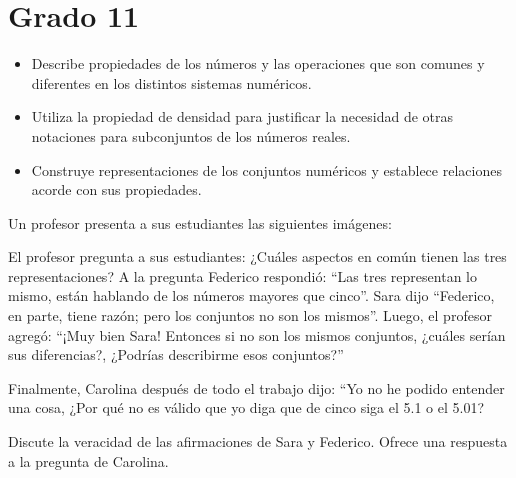\section{Grado 11}\label{grado:11}


\evidencias

\begin{itemize}
  \item Describe propiedades de los números y las operaciones que son comunes y diferentes en los distintos sistemas numéricos.
  \item Utiliza la propiedad de densidad para justificar la necesidad de otras notaciones para subconjuntos de los números reales.
  \item Construye representaciones de los conjuntos numéricos y establece relaciones acorde con sus propiedades.
\end{itemize}

\ejemplo

Un profesor presenta a sus estudiantes las siguientes imágenes:



El profesor pregunta a sus estudiantes: ¿Cuáles aspectos en común tienen las tres representaciones? A la pregunta Federico respondió: “Las tres representan lo mismo, están hablando de los números mayores que cinco”. Sara dijo “Federico, en parte, tiene razón; pero los conjuntos no son los mismos”. Luego, el profesor agregó: “¡Muy bien Sara! Entonces si no son los mismos conjuntos, ¿cuáles serían sus diferencias?, ¿Podrías describirme esos conjuntos?”

Finalmente, Carolina después de todo el trabajo dijo: “Yo no he podido entender una cosa, ¿Por qué no es válido que yo diga que de cinco siga el 5.1 o el 5.01?

Discute la veracidad de las afirmaciones de Sara y Federico. Ofrece una respuesta a la pregunta de Carolina.


